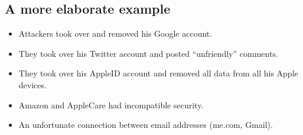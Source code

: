\subsection{A more elaborate example}

\begin{frame}
  \begin{example}
    \begin{itemize}
      \item Attackers took over and removed his Google account.
      \item They took over his Twitter account and posted \enquote{unfriendly} 
        comments.
      \item They took over his AppleID account and removed all data from all 
        his Apple devices.
    \end{itemize}
  \end{example}
\end{frame}

\begin{frame}
  \begin{example}
    \begin{itemize}
      \item Amazon and AppleCare had incompatible security.
      \item An unfortunate connection between email addresses (me.com, Gmail).
    \end{itemize}
  \end{example}
\end{frame}



\begin{frame}[allowframebreaks]
	\small
  \printbibliography
\end{frame}

